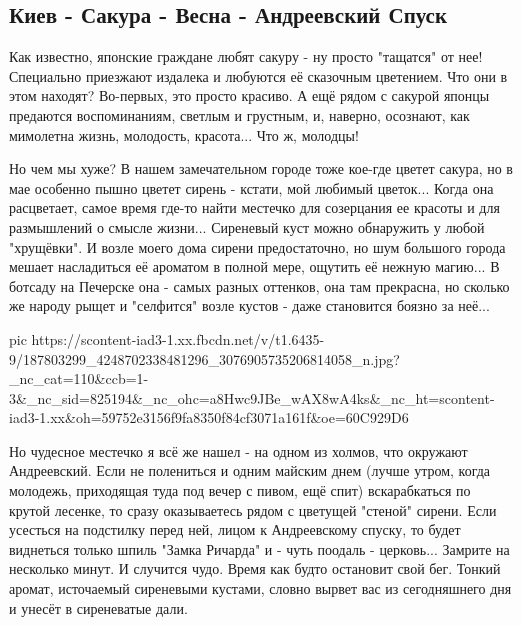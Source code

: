  
 
 
 
 
\subsection{Киев - Сакура - Весна - Андреевский Спуск}

Как известно, японские граждане любят сакуру -  ну просто "тащатся" от нее!
Специально приезжают издалека и любуются её сказочным цветением. Что они в этом
находят? Во-первых, это просто красиво. А ещё рядом с сакурой японцы предаются
воспоминаниям, светлым и грустным, и, наверно, осознают, как мимолетна жизнь,
молодость, красота... Что ж, молодцы!

Но чем мы хуже? В нашем замечательном городе тоже кое-где цветет сакура, но в
мае особенно пышно цветет сирень - кстати, мой любимый цветок... Когда она
расцветает, самое время где-то найти местечко для созерцания ее красоты и для
размышлений о смысле жизни... Сиреневый куст можно обнаружить у любой
"хрущёвки". И возле моего дома сирени предостаточно, но шум большого города
мешает насладиться её ароматом в полной мере, ощутить её нежную магию... В
ботсаду на Печерске она - самых разных оттенков, она там прекрасна, но сколько
же народу рыщет и "селфится" возле кустов - даже становится боязно за неё...

\ifcmt
  pic https://scontent-iad3-1.xx.fbcdn.net/v/t1.6435-9/187803299_4248702338481296_3076905735206814058_n.jpg?_nc_cat=110&ccb=1-3&_nc_sid=825194&_nc_ohc=a8Hwc9JBe_wAX8wA4ks&_nc_ht=scontent-iad3-1.xx&oh=59752e3156f9fa8350f84cf3071a161f&oe=60C929D6
\fi

Но чудесное местечко я всё же нашел - на одном из холмов, что окружают
Андреевский. Если не полениться и одним майским днем (лучше утром, когда
молодежь, приходящая туда под вечер с пивом, ещё спит) вскарабкаться по крутой
лесенке, то сразу оказываетесь рядом с цветущей "стеной" сирени. Если усесться
на подстилку перед ней, лицом к Андреевскому спуску, то будет виднеться только
шпиль "Замка Ричарда" и - чуть поодаль - церковь... Замрите на несколько минут.
И случится чудо.  Время как будто остановит свой бег. Тонкий аромат, источаемый
сиреневыми кустами, словно вырвет вас из сегодняшнего дня и унесёт в
сиреневатые дали.

